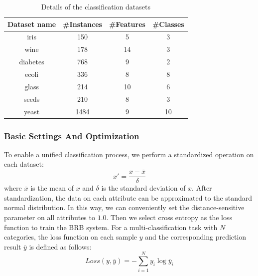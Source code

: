 \documentclass{ieeeaccess}
\begin{document}
\begin{table}
    \caption{Details of the classification datasets}
    \centering
    \normalsize
    \label{tab4}
    \begin{tabular}{cccc}
        \hline
        Dataset name & \#Instances & \#Features & \#Classes \\
        \hline
        iris         & 150         & 5          & 3         \\
        wine         & 178         & 14         & 3         \\
        diabetes     & 768         & 9          & 2         \\
        ecoli        & 336         & 8          & 8         \\
        glass        & 214         & 10         & 6         \\
        seeds        & 210         & 8          & 3         \\
        yeast        & 1484        & 9          & 10        \\
        \hline
    \end{tabular}
\end{table}



\subsubsection{Basic Settings And Optimization}
To enable a unified classification process, we perform a standardized operation on each dataset:
\begin{equation}
    x'=\frac{x-\overline{x}}{\delta}
\end{equation}
where $\overline{x}$ is the mean of $x$ and $\delta$ is the standard deviation of $x$.
After standardization, the data on each attribute can be approximated to the standard normal distribution.
In this way, we can conveniently set the distance-sensitive parameter on all attributes to $1.0$.
Then we select cross entropy as the loss function to train the BRB system.
For a multi-classification task with $N$ categories, the loss function on each sample $y$ and the corresponding prediction result $\overline{y}$ is defined as follows:
\begin{equation}
    Loss(y,\overline{y})=-\sum_{i=1}^Ny_{i}\log\overline{y}_i
\end{equation}
\end{document}
